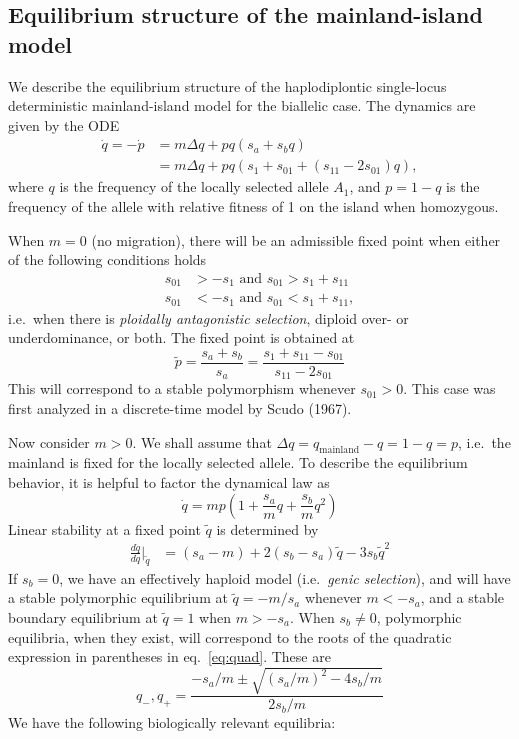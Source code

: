 \documentclass[
  11pt,
]{article}
\begin{document}
\hypertarget{equilibrium-structure-of-the-mainland-island-model}{%
\subsection{\texorpdfstring{Equilibrium structure of the mainland-island
model
\label{sec:mieq}}{Equilibrium structure of the mainland-island model }}\label{equilibrium-structure-of-the-mainland-island-model}}

We describe the equilibrium structure of the haplodiplontic single-locus
deterministic mainland-island model for the biallelic case. The dynamics
are given by the ODE \begin{align}
    \dot{q} = - \dot{p} 
    &= m\Delta q + pq(s_a + s_b q) \label{eq:ode1} \\
    &= m\Delta q + pq(s_1 + s_{01} + (s_{11} - 2s_{01}) q),
  \end{align} where \(q\) is the frequency of the locally selected
allele \(A_1\), and \(p=1-q\) is the frequency of the allele with
relative fitness of 1 on the island when homozygous.

When \(m=0\) (no migration), there will be an admissible fixed point
when either of the following conditions holds \begin{align}
  s_{01} &> -s_1 \text{ and } s_{01} > s_1 + s_{11} \\
  s_{01} &< -s_1 \text{ and } s_{01} < s_1 + s_{11} ,
\end{align} i.e.~when there is \emph{ploidally antagonistic selection},
diploid over- or underdominance, or both. The fixed point is obtained at
\begin{equation}
  \tilde{p} = \frac{s_a + s_b}{s_a} = \frac{s_1 + s_{11} - s_{01}}{s_{11} - 2s_{01}}
  \end{equation} This will correspond to a stable polymorphism whenever
\(s_{01} > 0\). This case was first analyzed in a discrete-time model by
Scudo (1967).

Now consider \(m>0\). We shall assume that
\(\Delta q = q_{\text{mainland}} - q = 1-q = p\), i.e.~the mainland is
fixed for the locally selected allele. To describe the equilibrium
behavior, it is helpful to factor the dynamical law as \begin{equation}
  \dot{q} = mp\left(1+ \frac{s_a}{m}q + \frac{s_b}{m}q^2\right)
  \label{eq:quad}
  \end{equation} Linear stability at a fixed point \(\tilde{q}\) is
determined by \begin{align}
  \frac{d\dot{q}}{dq}\big|_{\tilde{q}} 
    &= (s_a - m) + 2(s_b-s_a)\tilde{q} -3s_b \tilde{q}^2
  \end{align} If \(s_b = 0\), we have an effectively haploid model
(i.e.~\emph{genic selection}), and will have a stable polymorphic
equilibrium at \(\tilde{q} = -m/s_a\) whenever \(m < -s_a\), and a
stable boundary equilibrium at \(\tilde{q} = 1\) when \(m > -s_a\). When
\(s_b \ne 0\), polymorphic equilibria, when they exist, will correspond
to the roots of the quadratic expression in parentheses in
eq.~\ref{eq:quad}. These are
\[q_-, q_+ = \frac{-s_a/m \pm \sqrt{(s_a/m)^2 - 4s_b/m}}{2s_b/m}\] We
have the following biologically relevant equilibria:
\end{document}
